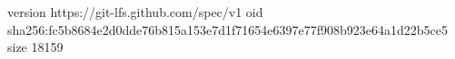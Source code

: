 version https://git-lfs.github.com/spec/v1
oid sha256:fc5b8684e2d0dde76b815a153e7d1f71654e6397e77f908b923e64a1d22b5ce5
size 18159
